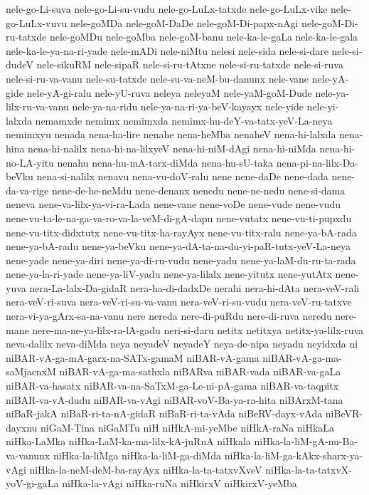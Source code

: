 {nele-go-Li-suva
nele-go-Li-su-vudu
nele-go-LuLx-tatxde
nele-go-LuLx-vike
nele-go-LuLx-vuvu
nele-goMDa
nele-goM-DaDe
nele-goM-Di-papx-nAgi
nele-goM-Di-ru-tatxde
nele-goMDu
nele-goMba
nele-goM-banu
nele-ka-le-gaLa
nele-ka-le-gala
nele-ka-le-ya-na-ri-yade
nele-mADi
nele-niMtu
nelesi
nele-sida
nele-si-dare
nele-si-dudeV
nele-sikuRM
nele-sipaR
nele-si-ru-tAtxne
nele-si-ru-tatxde
nele-si-ruva
nele-si-ru-va-vanu
nele-su-tatxde
nele-su-va-neM-bu-danunx
nele-vane
nele-yA-gide
nele-yA-gi-ralu
nele-yU-ruva
neleya
neleyaM
nele-yaM-goM-Dude
nele-ya-lilx-ru-va-vanu
nele-ya-na-ridu
nele-ya-na-ri-ya-beV-kayayx
nele-yide
nele-yi-lalxda
nemamxde
nemimx
nemimxda
nemimx-hu-deY-va-tatx-yeV-La-neya
nemimxyu
nenada
nena-ha-lire
nenahe
nena-heMba
nenaheV
nena-hi-lalxda
nena-hina
nena-hi-nalilx
nena-hi-na-lilxyeV
nena-hi-niM-dAgi
nena-hi-niMda
nena-hi-no-LA-yitu
nenahu
nena-hu-mA-tarx-diMda
nena-hu-sU-taka
nena-pi-na-lilx-Da-beVku
nena-si-nalilx
nenavu
nena-vu-doV-ralu
nene
nene-daDe
nene-dada
nene-da-va-rige
nene-de-he-neMdu
nene-denanx
nenedu
nene-ne-nedu
nene-si-dama
neneva
nene-va-lilx-ya-vi-ra-Lada
nene-vane
nene-voDe
nene-vude
nene-vudu
nene-vu-ta-le-na-ga-va-ro-va-la-veM-di-gA-dapu
nene-vutatx
nene-vu-ti-pupxdu
nene-vu-titx-didxtutx
nene-vu-titx-ha-rayAyx
nene-vu-titx-ralu
nene-ya-bA-rada
nene-ya-bA-radu
nene-ya-beVku
nene-ya-dA-ta-na-du-yi-paR-tutx-yeV-La-neya
nene-yade
nene-ya-diri
nene-ya-di-ru-vudu
nene-yadu
nene-ya-laM-du-ru-ta-rada
nene-ya-la-ri-yade
nene-ya-liV-yadu
nene-ya-lilalx
nene-yitutx
nene-yutAtx
nene-yuva
nera-La-lalx-Da-gidaR
nera-ha-di-dadxDe
nerahi
nera-hi-dAta
nera-veV-rali
nera-veV-ri-suva
nera-veV-ri-su-va-vanu
nera-veV-ri-su-vudu
nera-veV-ru-tatxve
nera-vi-ya-gArx-sa-na-vanu
nere
nereda
nere-di-puRdu
nere-di-ruva
neredu
nere-mane
nere-ma-ne-ya-lilx-ra-lA-gadu
neri-si-daru
netitx
netitxya
netitx-ya-lilx-ruva
neva-dalilx
neva-diMda
neya
neyadeV
neyadeY
neya-de-nipa
neyadu
neyidxda
ni
niBAR-vA-ga-mA-garx-na-SATx-gamaM
niBAR-vA-gama
niBAR-vA-ga-ma-saMjacnxM
niBAR-vA-ga-ma-sathxla
niBARva
niBAR-vada
niBAR-va-gaLa
niBAR-va-hasatx
niBAR-va-na-SaTxM-ga-Le-ni-pA-gama
niBAR-va-taqpitx
niBAR-va-vA-dudu
niBAR-va-vAgi
niBAR-voV-Ba-ya-ra-hita
niBArxM-tana
niBaR-jakA
niBaR-ri-ta-nA-gidaR
niBaR-ri-ta-vAda
niBeRV-dayx-vAda
niBeVR-dayxnu
niGaM-Tina
niGaMTu
niH
niHkA-mi-yeMbe
niHkA-raNa
niHkaLa
niHka-LaMka
niHka-LaM-ka-ma-lilx-kA-juRnA
niHkala
niHka-la-liM-gA-nu-Ba-va-vanunx
niHka-la-liMga
niHka-la-liM-ga-diMda
niHka-la-liM-ga-kAkx-sharx-ya-vAgi
niHka-la-neM-deM-ba-rayAyx
niHka-la-ta-tatxvXveV
niHka-la-ta-tatxvX-yoV-gi-gaLa
niHka-la-vAgi
niHka-ruNa
niHkirxV
niHkirxV-yeMba
}

